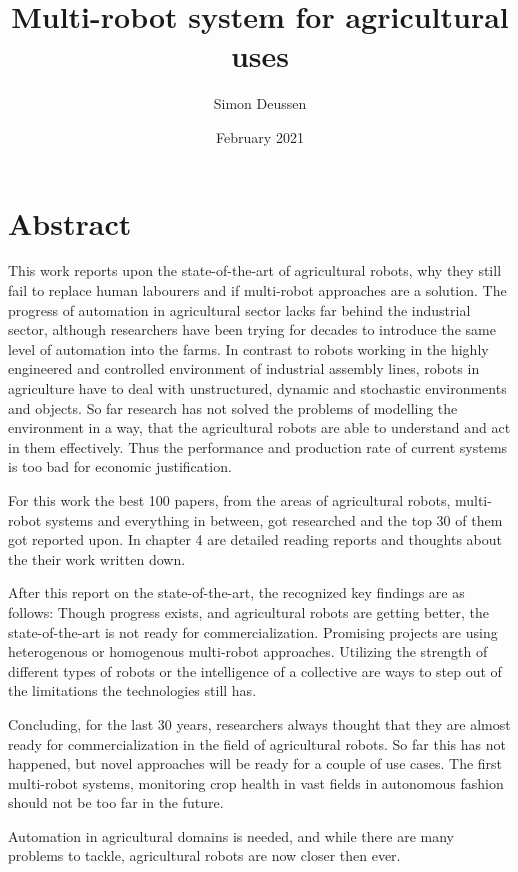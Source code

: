 \documentclass{report}
\title{Multi-robot system for agricultural uses}
\date{February 2021}
\author{Simon Deussen}
\begin{document}
\begin{titlepage}
    \maketitle
\end{titlepage}



\newpage
\chapter*{Abstract} 

This work reports upon the state-of-the-art of agricultural robots, why they still fail to replace human labourers and if multi-robot approaches are a solution. 
The progress of automation in agricultural sector lacks far behind the industrial sector, although researchers have been trying for decades to introduce the same level of automation into the farms. In contrast to robots working in the highly engineered and controlled environment of industrial assembly lines, robots in agriculture have to deal with unstructured, dynamic and stochastic environments and objects. So far research has not solved the problems of modelling the environment in a way, that the agricultural robots are able to understand and act in them effectively. Thus the performance and production rate of current systems is too bad for economic justification. 

For this work the best 100 papers, from the areas of agricultural robots, multi-robot systems and everything in between, got researched and the top 30 of them got reported upon. In chapter 4 are detailed reading reports and thoughts about the their work written down.

After this report on the state-of-the-art, the recognized key findings are as follows: Though progress exists, and agricultural robots are getting better, the state-of-the-art is not ready for commercialization. Promising projects are using heterogenous or homogenous multi-robot approaches. Utilizing the strength of different types of robots or the intelligence of a collective are ways to step out of the limitations the technologies still has.

Concluding, for the last 30 years, researchers always thought that they are almost ready for commercialization in the field of agricultural robots. So far this has not happened, but novel approaches will be ready for a couple of use cases. The first multi-robot systems, monitoring crop health in vast fields in autonomous fashion should not be too far in the future.

Automation in agricultural domains is needed, and while there are many problems to tackle, agricultural robots are now closer then ever.


\tableofcontents
\newpage








\newpage


\end{document}
